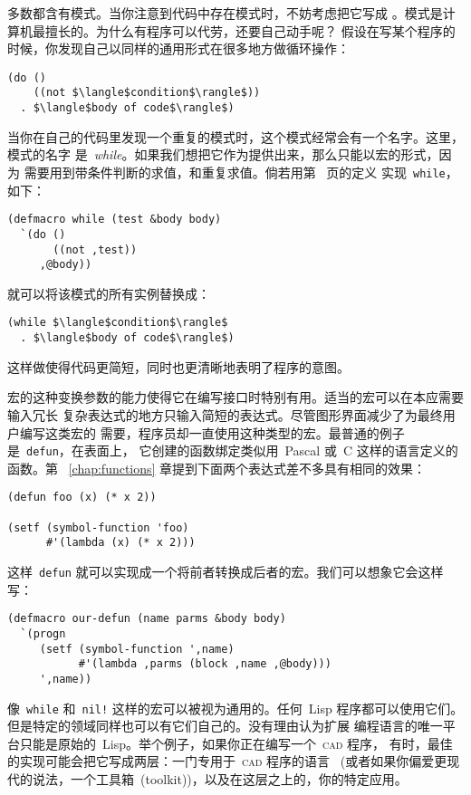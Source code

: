 多数\utility{}都含有模式。当你注意到代码中存在模式时，不妨考虑把它写成
\utility{}。模式是计算机最擅长的。为什么有程序可以代劳，还要自己动手呢？
假设在写某个程序的时候，你发现自己以同样的通用形式在很多地方做循环操作：
\begin{lstlisting}
(do ()
    ((not $\langle$condition$\rangle$))
  . $\langle$body of code$\rangle$)
\end{lstlisting}
当你在自己的代码里发现一个重复的模式时，这个模式经常会有一个名字。这里，模式的名字
是~\emph{while}。如果我们想把它作为\utility{}提供出来，那么只能以宏的形式，因为
需要用到带条件判断的求值，和重复求值。倘若用第~\pageref{macro:while} 页的定义
实现~\texttt{while}，如下：
\begin{lstlisting}
(defmacro while (test &body body)
  `(do ()
       ((not ,test))
     ,@body))
\end{lstlisting}
就可以将该模式的所有实例替换成：
\begin{lstlisting}
(while $\langle$condition$\rangle$
  . $\langle$body of code$\rangle$)
\end{lstlisting}
这样做使得代码更简短，同时也更清晰地表明了程序的意图。

宏的这种变换参数的能力使得它在编写接口时特别有用。适当的宏可以在本应需要输入冗长
复杂表达式的地方只输入简短的表达式。尽管图形界面减少了为最终用户编写这类宏的
需要，程序员却一直使用这种类型的宏。最普通的例子是~\texttt{defun}，在表面上，
它创建的函数绑定类似用~Pascal 或~C 这样的语言定义的函数。第
~\ref{chap:functions} 章提到下面两个表达式差不多具有相同的效果：
\begin{lstlisting}
(defun foo (x) (* x 2))

(setf (symbol-function 'foo)
      #'(lambda (x) (* x 2)))
\end{lstlisting}
这样~\texttt{defun} 就可以实现成一个将前者转换成后者的宏。我们可以想象它会这样
写：
\begin{lstlisting}
(defmacro our-defun (name parms &body body)
  `(progn
     (setf (symbol-function ',name)
           #'(lambda ,parms (block ,name ,@body)))
     ',name))
\end{lstlisting}

像~\texttt{while} 和~\texttt{nil!} 这样的宏可以被视为通用的\utility{}。任何~Lisp
程序都可以使用它们。但是特定的领域同样也可以有它们自己的\utility{}。没有理由认为扩展
编程语言的唯一平台只能是原始的~Lisp。举个例子，如果你正在编写一个~\textsc{cad} 程序，
有时，最佳的实现可能会把它写成两层：一门专用于~\textsc{cad} 程序的语言
~(或者如果你偏爱更现代的说法，一个工具箱~(toolkit))，以及在这层之上的，你的特定应用。

